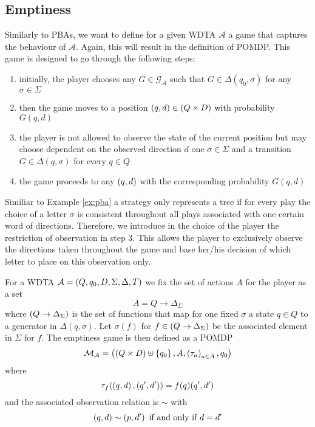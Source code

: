 \subsection{Emptiness}
Similarly to \acp{PBA}, we want to define for a given \ac{WDTA} $\mathcal{A}$
a game that captures the behaviour of $\mathcal{A}$. Again, this will result in
the definition of \ac{POMDP}. This game is designed to go through the following
steps:
\begin{enumerate}
  \item initially, the player chooses any $G\in\mathcal{G}_{\mathcal{A}}$
    such that $G\in\Delta(q_{0},\sigma)$ for any $\sigma\in\Sigma$
  \item then the game moves to a position $\left(q,d\right)\in\left(Q\times D\right)$
    with probability $G(q,d)$
  \item the player is not allowed to observe the state of the current position
    but may choose dependent on the observed direction $d$ one
    $\sigma\in\Sigma$ and a transition $G\in\Delta(q,\sigma)$ for every
    $q\in Q$
  \item the game proceeds to any $\left(q,d\right)$ with the corresponding
    probability $G(q,d)$
\end{enumerate}
Similiar to Example \ref{ex:pba} a strategy only represents a tree if for every
play the choice of a letter $\sigma$ is consistent throughout all plays
associated with one certain word of directions. Therefore, we introduce in the
choice of the player the restriction of observation in step $3$. This allows
the player to exclusively observe the directions taken throughout the game and
base her/his decision of which letter to place on this observation only.
\begin{definition}
  For a \ac{WDTA} $\mathcal{A} = \left(Q, q_{0}, D, \Sigma, \Delta, T\right)$ we
  fix the set of actions $A$ for the player as a set
  \begin{equation*}
    A = Q\rightarrow\Delta_{\Sigma}
  \end{equation*}
  where $\left(Q\rightarrow\Delta_{\Sigma}\right)$ is the set of functions that map
  for one fixed $\sigma$ a state $q\in Q$ to a generator in $\Delta(q,\sigma)$.
  Let $\sigma(f)$ for $f\in\left(Q\rightarrow\Delta_{\Sigma}\right)$ be the
  associated element in $\Sigma$ for $f$. The emptiness game is then defined as
  a \ac{POMDP}
  \begin{equation*}
    \mathcal{M}_{\mathcal{A}} = \left(\left(Q\times D\right)\uplus \left\{q_{0}\right\}, A,
    \left(\tau_{a}\right)_{a\in A}, q_{0}\right)
  \end{equation*}
  where
  \begin{equation*}
    \tau_{f}(\left(q,d\right),\left(q',d'\right)) = f(q)(q',d')
  \end{equation*}
  and the associated observation relation is $\sim$ with
  \begin{equation*}
    \left(q, d\right)\sim\left(p, d'\right)\text{ if and only if } d = d'
  \end{equation*}
\end{definition}
